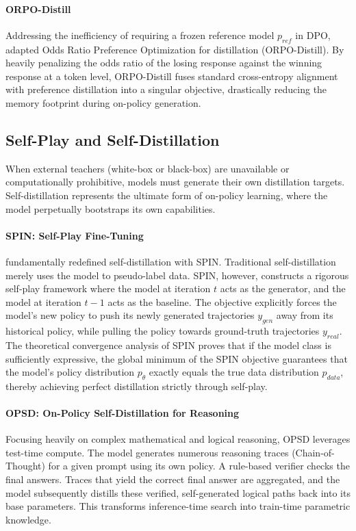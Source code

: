 \paragraph{ORPO-Distill}
Addressing the inefficiency of requiring a frozen reference model $p_{ref}$ in DPO, \citet{2509.25100} adapted Odds Ratio Preference Optimization for distillation (ORPO-Distill). By heavily penalizing the odds ratio of the losing response against the winning response at a token level, ORPO-Distill fuses standard cross-entropy alignment with preference distillation into a singular objective, drastically reducing the memory footprint during on-policy generation.

\subsection{Self-Play and Self-Distillation}
\label{subsec:self_distill}

When external teachers (white-box or black-box) are unavailable or computationally prohibitive, models must generate their own distillation targets. Self-distillation represents the ultimate form of on-policy learning, where the model perpetually bootstraps its own capabilities.

\paragraph{SPIN: Self-Play Fine-Tuning}
\citet{2401.01335} fundamentally redefined self-distillation with SPIN. Traditional self-distillation merely uses the model to pseudo-label data. SPIN, however, constructs a rigorous self-play framework where the model at iteration $t$ acts as the generator, and the model at iteration $t-1$ acts as the baseline. The objective explicitly forces the model's new policy to push its newly generated trajectories $y_{gen}$ away from its historical policy, while pulling the policy towards ground-truth trajectories $y_{real}$. 
The theoretical convergence analysis of SPIN proves that if the model class is sufficiently expressive, the global minimum of the SPIN objective guarantees that the model's policy distribution $p_\theta$ exactly equals the true data distribution $p_{data}$, thereby achieving perfect distillation strictly through self-play.

\paragraph{OPSD: On-Policy Self-Distillation for Reasoning}
Focusing heavily on complex mathematical and logical reasoning, OPSD \citep{2601.18734} leverages test-time compute. The model generates numerous reasoning traces (Chain-of-Thought) for a given prompt using its own policy. A rule-based verifier checks the final answers. Traces that yield the correct final answer are aggregated, and the model subsequently distills these verified, self-generated logical paths back into its base parameters. This transforms inference-time search into train-time parametric knowledge.

